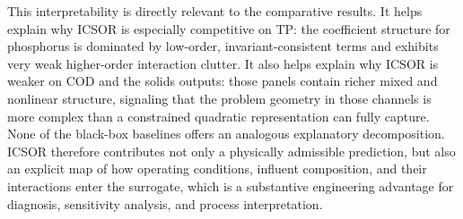 \documentclass[11pt]{article}
\begin{document}
This interpretability is directly relevant to the comparative results. It helps explain why ICSOR is especially competitive on TP: the coefficient structure for phosphorus is dominated by low-order, invariant-consistent terms and exhibits very weak higher-order interaction clutter. It also helps explain why ICSOR is weaker on COD and the solids outputs: those panels contain richer mixed and nonlinear structure, signaling that the problem geometry in those channels is more complex than a constrained quadratic representation can fully capture. None of the black-box baselines offers an analogous explanatory decomposition. ICSOR therefore contributes not only a physically admissible prediction, but also an explicit map of how operating conditions, influent composition, and their interactions enter the surrogate, which is a substantive engineering advantage for diagnosis, sensitivity analysis, and process interpretation.
\end{document}
